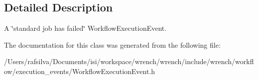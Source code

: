 \subsection{Detailed Description}
A \char`\"{}standard job has failed\char`\"{} Workflow\+Execution\+Event. 

The documentation for this class was generated from the following file\+:\begin{DoxyCompactItemize}
\item 
/\+Users/rafsilva/\+Documents/isi/workspace/wrench/wrench/include/wrench/workflow/execution\+\_\+events/Workflow\+Execution\+Event.\+h\end{DoxyCompactItemize}
